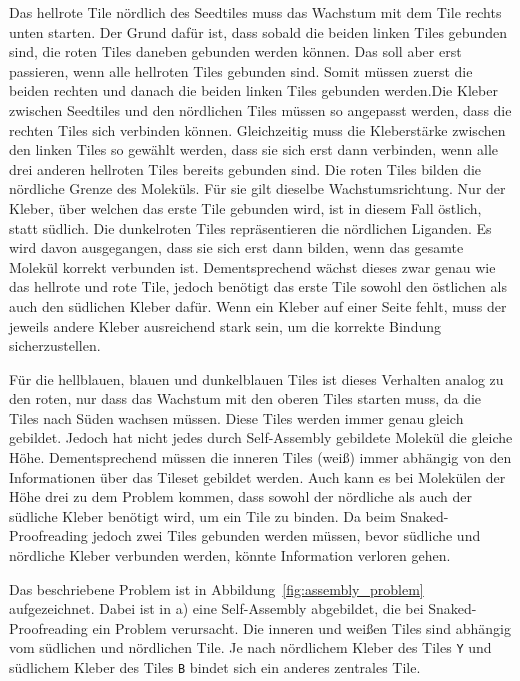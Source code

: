 Das hellrote Tile nördlich des Seedtiles muss das Wachstum mit dem Tile rechts unten starten. Der Grund dafür ist, dass sobald die beiden linken Tiles gebunden sind, die roten Tiles daneben gebunden werden können. Das soll aber erst passieren, wenn alle hellroten Tiles gebunden sind. Somit müssen zuerst die beiden rechten und danach die beiden linken Tiles gebunden werden.Die Kleber zwischen Seedtiles und den nördlichen Tiles müssen so angepasst werden, dass die rechten Tiles sich verbinden können. Gleichzeitig muss die Kleberstärke zwischen den linken Tiles so gewählt werden, dass sie sich erst dann verbinden, wenn alle drei anderen hellroten Tiles bereits gebunden sind. Die roten Tiles bilden die nördliche Grenze des Moleküls. Für sie gilt dieselbe Wachstumsrichtung. Nur der Kleber, über welchen das erste Tile gebunden wird, ist in diesem Fall östlich, statt südlich. Die dunkelroten Tiles repräsentieren die nördlichen Liganden. Es wird davon ausgegangen, dass sie sich erst dann bilden, wenn das gesamte Molekül korrekt verbunden ist. Dementsprechend wächst dieses zwar genau wie das hellrote und rote Tile, jedoch benötigt das erste Tile sowohl den östlichen als auch den südlichen Kleber dafür. Wenn ein Kleber auf einer Seite fehlt, muss der jeweils andere Kleber ausreichend stark sein, um die korrekte Bindung sicherzustellen.

Für die hellblauen, blauen und dunkelblauen Tiles ist dieses Verhalten analog zu den roten, nur dass das 
Wachstum mit den oberen Tiles starten muss, da die Tiles nach Süden wachsen müssen. Diese Tiles werden immer genau gleich gebildet. Jedoch hat nicht jedes durch Self-Assembly gebildete Molekül die gleiche Höhe. Dementsprechend müssen die inneren Tiles (weiß) immer abhängig von den Informationen über das Tileset gebildet werden. Auch kann es bei Molekülen der Höhe drei zu dem Problem kommen, dass sowohl der nördliche als auch der südliche Kleber benötigt wird, um ein Tile zu binden. Da beim Snaked-Proofreading jedoch zwei Tiles gebunden werden müssen, bevor südliche und nördliche Kleber verbunden werden, könnte Information verloren gehen. 

Das beschriebene Problem ist in Abbildung~\ref{fig:assembly_problem} aufgezeichnet. Dabei ist in a) eine Self-Assembly abgebildet, die bei Snaked-Proofreading ein Problem verursacht. Die inneren und weißen Tiles sind abhängig vom südlichen und nördlichen Tile.
Je nach nördlichem Kleber des Tiles \texttt{Y} und südlichem Kleber des Tiles \texttt{B} bindet sich ein anderes zentrales Tile. 

